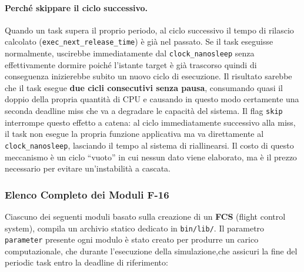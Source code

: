 \paragraph{Perché skippare il ciclo successivo.}
Quando un task supera il proprio periodo, al ciclo successivo il tempo di rilascio calcolato (\texttt{exec\_next\_release\_time}) è già nel passato. Se il task eseguisse normalmente, uscirebbe immediatamente dal \texttt{clock\_nanosleep} senza effettivamente dormire poiché l'istante target è già trascorso quindi di conseguenza inizierebbe subito un nuovo ciclo di esecuzione. Il risultato sarebbe che il task esegue \textbf{due cicli consecutivi senza pausa}, consumando quasi il doppio della propria quantità di CPU e causando in questo modo certamente una seconda deadline miss che va a degradare le capacità del sistema. Il flag \texttt{skip} interrompe questo effetto a catena: al ciclo immediatamente successivo alla miss, il task non esegue la propria funzione applicativa ma va direttamente al \texttt{clock\_nanosleep}, lasciando il tempo al sistema di riallinearsi. Il costo di questo meccanismo è un ciclo ``vuoto'' in cui nessun dato viene elaborato, ma è il prezzo necessario per evitare un'instabilità a cascata.

\subsubsection{Elenco Completo dei Moduli F-16}

Ciascuno dei seguenti moduli basato sulla creazione di un \textbf{FCS} (flight control system), compila un archivio statico dedicato in \texttt{bin/lib/}. Il parametro \texttt{parameter} presente ogni modulo è stato creato  per produrre un carico computazionale, che durante l'esecuzione della simulazione,che assicuri la fine del periodic task entro la deadline di riferimento:

